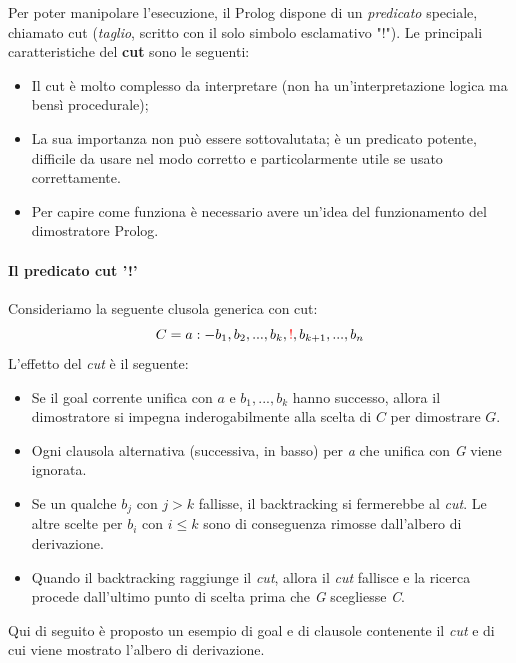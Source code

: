 \documentclass[11pt]{article}
\begin{document}
Per poter manipolare l'esecuzione, il Prolog dispone di un \textit{predicato} speciale, chiamato \color{red} cut \color{black} (\textit{taglio}, scritto con il solo simbolo esclamativo "!"). Le principali caratteristiche del \textbf{cut} sono le seguenti:
\begin{itemize}
	\item Il cut è molto complesso da interpretare (non ha un'interpretazione logica ma bensì procedurale);
	\item La sua importanza non può essere sottovalutata; è un predicato potente, difficile da usare nel modo corretto e particolarmente utile se usato correttamente.
	\item Per capire come funziona è necessario avere un'idea del funzionamento del dimostratore Prolog.
\end{itemize}

\paragraph{Il predicato cut '!'} Consideriamo la seguente clusola generica con \color{red}cut\color{black}:
\begin{equation*}
C= a:-b_1, b_2,...,b_k, \color{red}!\color{black}, b_{k+1}, ..., b_n
\end{equation*}
L'effetto del \textit{cut} è il seguente:
\begin{itemize}
	\item Se il goal corrente unifica con $a$ e $b_1,...,b_k$ hanno successo, allora il dimostratore si impegna inderogabilmente alla scelta di $C$ per dimostrare $G$.
	\item Ogni clausola alternativa (successiva, in basso) per \textit{a} che unifica con \textit{G} viene ignorata.
	\item Se un qualche $b_j$ con $j > k$ fallisse, il backtracking si fermerebbe al \textit{cut}. Le altre scelte per $b_i$ con $i \leqslant k$ sono di conseguenza rimosse dall'albero di derivazione.
	\item Quando il backtracking raggiunge il \textit{cut}, allora il \textit{cut} fallisce e la ricerca procede dall'ultimo punto di scelta prima che \textit{G} scegliesse \textit{C}.
\end{itemize}

Qui di seguito è proposto un esempio di goal e di clausole contenente il \textit{cut} e di cui viene mostrato l'albero di derivazione.
\end{document}
